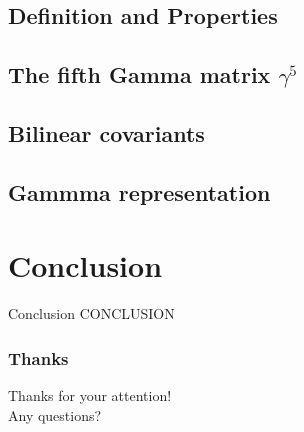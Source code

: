 \documentclass[serif,11pt]{beamer}
\begin{document}
\subsection{Definition and Properties}

\subsection{The fifth Gamma matrix $\gamma^5$}

\subsection{Bilinear covariants}

\subsection{Gammma representation}

\section{Conclusion}
\begin{frame}{Conclusion}
CONCLUSION
\end{frame}




\begin{frame}\frametitle{Thanks}
\centering

Thanks for your attention!\\
Any questions?
\end{frame}



\end{document}
